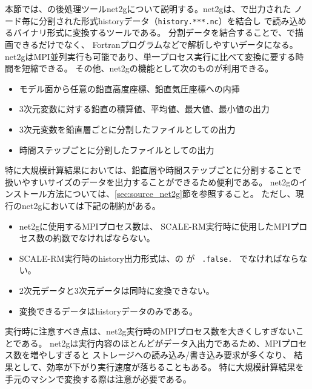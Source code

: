 \section{\SecAdvancePostprosess} \label{sec:net2g}

本節では、\scalerm の後処理ツールnet2gについて説明する。net2gは、\scalerm で出力された
ノード毎に分割された{\netcdf}形式historyデータ（\verb|history.***.nc|）を結合し
{\grads}で読み込めるバイナリ形式に変換するツールである。
分割データを結合することで、{\grads}で描画できるだけでなく、
Fortranプログラムなどで解析しやすいデータになる。
net2gはMPI並列実行も可能であり、単一プロセス実行に比べて変換に要する時間を短縮できる。
その他、net2gの機能として次のものが利用できる。

\begin{itemize}
 \item モデル面から任意の鉛直高度座標、鉛直気圧座標への内挿
 \item 3次元変数に対する鉛直の積算値、平均値、最大値、最小値の出力
 \item 3次元変数を鉛直層ごとに分割したファイルとしての出力
 \item 時間ステップごとに分割したファイルとしての出力
\end{itemize}

特に大規模計算結果においては、鉛直層や時間ステップごとに分割することで
扱いやすいサイズのデータを出力することができるため便利である。
net2gのインストール方法については、\ref{sec:source_net2g}節を参照すること。
ただし、現行のnet2gにおいては下記の制約がある。
\begin{itemize}
 \item net2gに使用するMPIプロセス数は、
SCALE-RM実行時に使用したMPIプロセス数の約数でなければならない。
 \item SCALE-RM実行時のhistory出力形式は、の が \verb| .false. | でなければならない。
 \item 2次元データと3次元データは同時に変換できない。
 \item 変換できるデータはhistoryデータのみである。
\end{itemize}

実行時に注意すべき点は、net2g実行時のMPIプロセス数を大きくしすぎないことである。
net2gは実行内容のほとんどがデータ入出力であるため、MPIプロセス数を増やしすぎると
ストレージへの読み込み/書き込み要求が多くなり、
結果として、効率が下がり実行速度が落ちることもある。
特に大規模計算結果を手元のマシンで変換する際は注意が必要である。\\

